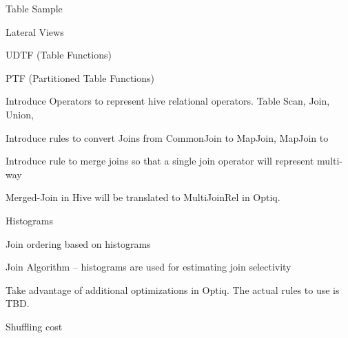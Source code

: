 \documentclass{vldb}
\newcommand{\ii}{\item}
\begin{document}
\ii Table Sample
\ii Lateral Views
\ii UDTF (Table Functions)
\ii PTF (Partitioned Table Functions)
\ii Introduce Operators to represent hive relational operators. Table Scan, Join, Union,
\ii Introduce rules to convert Joins from CommonJoin to MapJoin, MapJoin to
\ii Introduce rule to merge joins so that a single join operator will represent multi-way
\ii Merged-Join in Hive will be translated to MultiJoinRel in Optiq.
\ii Histograms
\ii Join ordering based on histograms
\ii Join Algorithm – histograms are used for estimating join selectivity
\ii Take advantage of additional optimizations in Optiq. The actual rules to use is TBD.
\ii Shuffling cost
\end{document}
